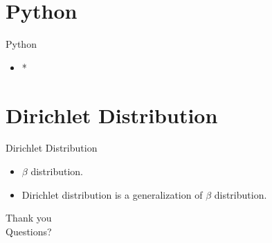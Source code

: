 \documentclass[handout]{beamer}
\begin{document}
\section{Python}
\begin{frame}{Python}
	\begin{itemize}
	\item *
	\end{itemize}
\end{frame}

\section{Dirichlet Distribution}
\begin{frame}{Dirichlet Distribution}
\begin{itemize}
\item $\beta$ distribution.
\item Dirichlet distribution is a generalization of 
$\beta$ distribution.
\end{itemize}
\end{frame}

\begin{frame}
\huge{Thank you}\\
\huge{Questions?}\\
\end{frame}
\end{document}
